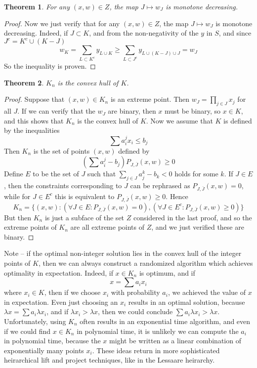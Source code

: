 \documentclass{article}
\theoremstyle{plain}
\newtheorem{theorem}{Theorem}
\theoremstyle{definition}
\begin{document}
\begin{theorem}
    For any $(x,w) \in Z$, the map $J \mapsto w_J$ is monotone decreasing.
\end{theorem}
\begin{proof}
    Now we just verify that for any $(x,w) \in Z$, the map $J \mapsto w_J$ is monotone decreasing. Indeed, if $J \subset K$, and from the non-negativity of the $y$ in $S$, and since $J^c = K^c \cup (K - J)$
    \[ w_K = \sum_{L \subset K^c} y_{L \cup K} \geq \sum_{L \subset J^c} y_{L \cup (K - J) \cup J} = w_J \]
    So the inequality is proven.
\end{proof}

\begin{theorem}
    $K_n$ is the convex hull of $K$.
\end{theorem}
\begin{proof}
    Suppose that $(x,w) \in K_n$ is an extreme point. Then $w_J = \prod_{j \in J} x_j$ for all $J$. If we can verify that the $w_J$ are binary, then $x$ must be binary, so $x \in K$, and this shows that $K_n$ is the convex hull of $K$. Now we assume that $K$ is defined by the inequalities
    \[ \sum a^j_i x_i \leq b_j \]
    Then $K_n$ is the set of points $(x,w)$ defined by
    \[ \left( \sum a^j_i - b_j \right) P_{J,\overline{J}}(x,w) \geq 0 \]
    Define $E$ to be the set of $J$ such that $\sum_{j \in J} a^k_j - b_k < 0$ holds for some $k$. If $J \in E$, then the constraints corresponding to $J$ can be rephrased as $P_{J,\overline{J}}(x,w) = 0$, while for $J \in E^c$ this is equivalent to $P_{J,\overline{J}}(x,w) \geq 0$. Hence
    \[ K_n = \{ (x,w): (\forall J \in E: P_{J,\overline{J}}(x,w) = 0), (\forall J \in E^c: P_{J,\overline{J}}(x,w) \geq 0) \} \]
    But then $K_n$ is just a subface of the set $Z$ considered in the last proof, and so the extreme points of $K_n$ are all extreme points of $Z$, and we just verified these are binary.
\end{proof}

Note -- if the optimal non-integer solution lies in the convex hull of the integer points of $K$, then we can always construct a randomized algorithm which achieves optimality in expectation. Indeed, if $x \in K_n$ is optimum, and if
%
\[ x = \sum a_i x_i \]
%
where $x_i \in K$, then if we choose $x_i$ with probability $a_i$, we achieved the value of $x$ in expectation. Even just choosing an $x_i$ results in an optimal solution, because $\lambda x = \sum a_i \lambda x_i$, and if $\lambda x_i > \lambda x$, then we could conclude $\sum a_i \lambda x_i > \lambda x$. Unfortunately, using $K_n$ often results in an exponential time algorithm, and even if we could find $x \in K_n$ in polynomial time, it is unlikely we can compute the $a_i$ in polynomial time, because the $x$ might be written as a linear combination of exponentially many points $x_i$. These ideas return in more sophisticated heirarchical lift and project techniques, like in the Lessaare heirarchy.
\end{document}
